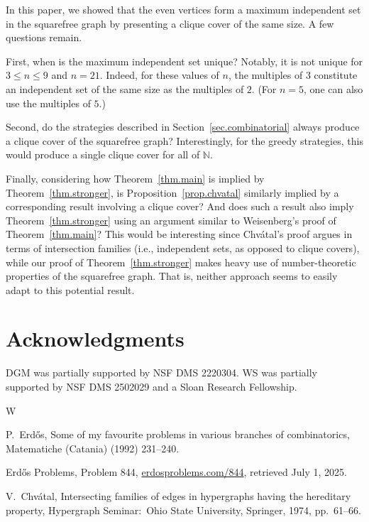 \documentclass{article}
\theoremstyle{plain}
\theoremstyle{definition}
\theoremstyle{remark}
\newcommand{\Erdos}{Erd\H{o}s}
\newcommand{\Chvatal}{Chv\'atal}
\begin{document}
In this paper, we showed that the even vertices form a maximum independent set in the squarefree graph by presenting a clique cover of the same size.
A few questions remain.

First, when is the maximum independent set unique?
Notably, it is not unique for $3\le n\le 9$ and $n=21$.
Indeed, for these values of $n$, the multiples of $3$ constitute an independent set of the same size as the multiples of $2$.
(For $n=5$, one can also use the multiples of $5$.)

Second, do the strategies described in Section~\ref{sec.combinatorial} always produce a clique cover of the squarefree graph?
Interestingly, for the greedy strategies, this would produce a single clique cover for all of $\mathbb{N}$.

Finally, considering how Theorem~\ref{thm.main} is implied by Theorem~\ref{thm.stronger}, is Proposition~\ref{prop.chvatal} similarly implied by a corresponding result involving a clique cover?
And does such a result also imply Theorem~\ref{thm.stronger} using an argument similar to Weisenberg's proof of Theorem~\ref{thm.main}?
This would be interesting since \Chvatal{}'s proof argues in terms of intersection families (i.e., independent sets, as opposed to clique covers), while our proof of Theorem~\ref{thm.stronger} makes heavy use of number-theoretic properties of the squarefree graph.
That is, neither approach seems to easily adapt to this potential result.


\section*{Acknowledgments}

DGM was partially supported by NSF DMS 2220304.
WS was partially supported by NSF DMS 2502029 and a Sloan Research Fellowship.


\begin{thebibliography}{W}


P.\ \Erdos{},
Some of my favourite problems in various branches of combinatorics,
Matematiche (Catania) (1992) 231--240.

\Erdos{} Problems, Problem 844,
\url{erdosproblems.com/844},
retrieved July 1, 2025.

V.\ \Chvatal{},
Intersecting families of edges in hypergraphs having the hereditary property,
Hypergraph Seminar:\ Ohio State University,
Springer, 1974, pp.\ 61--66.

\end{thebibliography}
\end{document}
